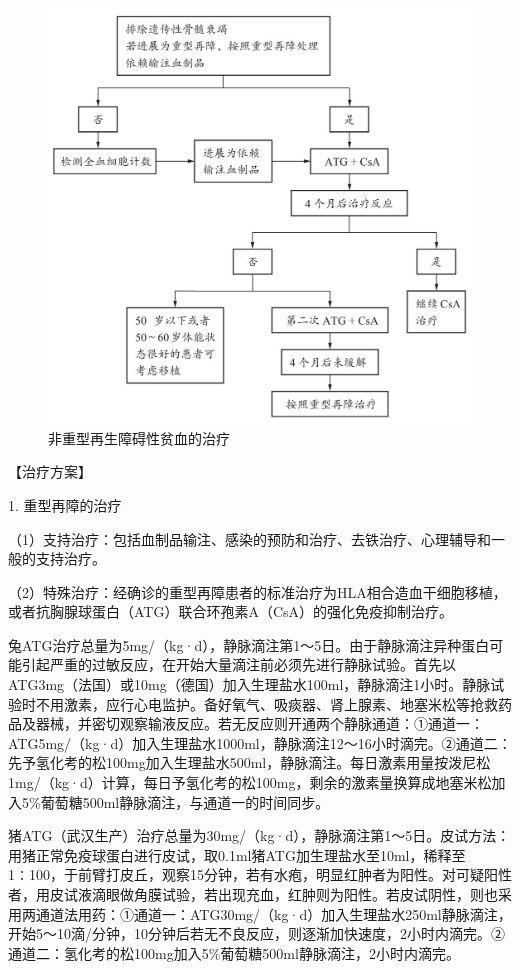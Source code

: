 \begin{figure}[!htbp]
 \centering
 \includegraphics{./images/Image00135.jpg}
 \captionsetup{justification=centering}
 \caption{非重型再生障碍性贫血的治疗}
 \label{fig5-1-2}
  \end{figure} 

【治疗方案】

1. 重型再障的治疗

（1）支持治疗：包括血制品输注、感染的预防和治疗、去铁治疗、心理辅导和一般的支持治疗。

（2）特殊治疗：经确诊的重型再障患者的标准治疗为HLA相合造血干细胞移植，或者抗胸腺球蛋白（ATG）联合环孢素A（CsA）的强化免疫抑制治疗。

兔ATG治疗总量为5mg/（kg·d），静脉滴注第1～5日。由于静脉滴注异种蛋白可能引起严重的过敏反应，在开始大量滴注前必须先进行静脉试验。首先以ATG3mg（法国）或10mg（德国）加入生理盐水100ml，静脉滴注1小时。静脉试验时不用激素，应行心电监护。备好氧气、吸痰器、肾上腺素、地塞米松等抢救药品及器械，并密切观察输液反应。若无反应则开通两个静脉通道：①通道一：ATG5mg/（kg·d）加入生理盐水1000ml，静脉滴注12～16小时滴完。②通道二：先予氢化考的松100mg加入生理盐水500ml，静脉滴注。每日激素用量按泼尼松1mg/（kg·d）计算，每日予氢化考的松100mg，剩余的激素量换算成地塞米松加入5\%葡萄糖500ml静脉滴注，与通道一的时间同步。

猪ATG（武汉生产）治疗总量为30mg/（kg·d），静脉滴注第1～5日。皮试方法：用猪正常免疫球蛋白进行皮试，取0.1ml猪ATG加生理盐水至10ml，稀释至1∶100，于前臂打皮丘，观察15分钟，若有水疱，明显红肿者为阳性。对可疑阳性者，用皮试液滴眼做角膜试验，若出现充血，红肿则为阳性。若皮试阴性，则也采用两通道法用药：①通道一：ATG30mg/（kg·d）加入生理盐水250ml静脉滴注，开始5～10滴/分钟，10分钟后若无不良反应，则逐渐加快速度，2小时内滴完。②通道二：氢化考的松100mg加入5\%葡萄糖500ml静脉滴注，2小时内滴完。

